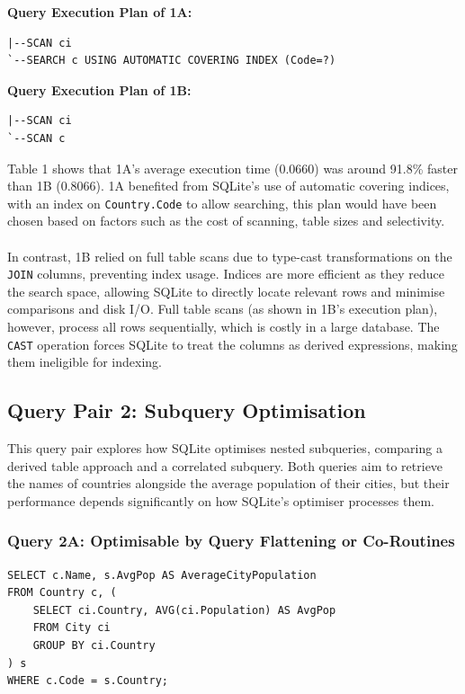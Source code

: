 \documentclass[11pt]{article}
\begin{document}
\textbf{Query Execution Plan of 1A:}
\begin{verbatim}
|--SCAN ci
`--SEARCH c USING AUTOMATIC COVERING INDEX (Code=?)
\end{verbatim}

\textbf{Query Execution Plan of 1B:}
\begin{verbatim}
|--SCAN ci
`--SCAN c
\end{verbatim}

\noindent Table 1 shows that 1A's average execution time (0.0660) was around 91.8\% faster than 1B (0.8066). 1A benefited from SQLite's use of automatic
covering indices, with an index on \texttt{Country.Code} to allow searching, this plan would have been chosen based on factors such as the cost of scanning, table sizes
and selectivity.
\\ \\
In contrast, 1B relied on full table scans due to type-cast transformations on the \texttt{JOIN} columns, preventing index usage. Indices are more efficient
as they reduce the search space, allowing SQLite to directly locate relevant rows and minimise comparisons and disk I/O. Full table scans (as shown in 1B's execution plan), however,
process all rows sequentially, which is costly in a large database. The \texttt{CAST} operation forces SQLite to treat the columns as derived expressions, making them ineligible for indexing.

\subsection{Query Pair 2: Subquery Optimisation}

This query pair explores how SQLite optimises nested subqueries, comparing a derived table approach and a correlated subquery.
Both queries aim to retrieve the names of countries alongside the average population of their cities, but their performance depends significantly
on how SQLite's optimiser processes them.

\subsubsection{Query 2A: Optimisable by Query Flattening or Co-Routines}

\begin{verbatim}
SELECT c.Name, s.AvgPop AS AverageCityPopulation
FROM Country c, (
    SELECT ci.Country, AVG(ci.Population) AS AvgPop
    FROM City ci
    GROUP BY ci.Country
) s
WHERE c.Code = s.Country;
\end{verbatim}
\end{document}
